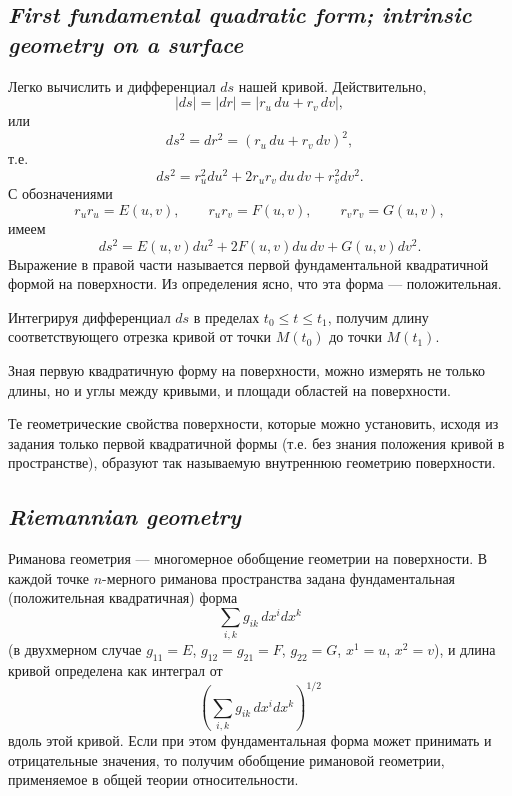 \subsection*{ \textit{First fundamental quadratic form; intrinsic geometry on a surface}}
\begin{rusblock}
Легко вычислить и дифференциал $ds$ нашей кривой. Действительно,
\[
|ds|=|dr|=|r_u\,du+r_v\,dv|,
\]
или
\[
ds^2=dr^2=(r_u\,du+r_v\,dv)^2,
\]
т.е.
\[
ds^2=r_u^2du^2+2r_ur_v\,du\,dv+r_v^2dv^2.
\]
С обозначениями
\[
r_ur_u=E(u,v),\qquad r_ur_v=F(u,v),\qquad r_vr_v=G(u,v),
\]
имеем
\[
ds^2=E(u,v)du^2+2F(u,v)du\,dv+G(u,v)dv^2.
\]
Выражение в правой части называется первой фундаментальной квадратичной формой на поверхности. Из определения ясно, что эта форма --- положительная.

Интегрируя дифференциал $ds$ в пределах $t_0\le t\le t_1$, получим длину соответствующего отрезка кривой от точки $M(t_0)$ до точки $M(t_1)$.

Зная первую квадратичную форму на поверхности, можно измерять не только длины, но и углы между кривыми, и площади областей на поверхности.

Те геометрические свойства поверхности, которые можно установить, исходя из задания только первой квадратичной формы (т.е. без знания положения кривой в пространстве), образуют так называемую внутреннюю геометрию поверхности.
\end{rusblock}

\subsection*{ \textit{Riemannian geometry}}
\begin{rusblock}
Риманова геометрия --- многомерное обобщение геометрии на поверхности. В каждой точке $n$-мерного риманова пространства задана фундаментальная (положительная квадратичная) форма
\[
\sum_{i,k}g_{ik}\,dx^i dx^k
\]
(в двухмерном случае $g_{11}=E$, $g_{12}=g_{21}=F$, $g_{22}=G$, $x^1=u$, $x^2=v$), и длина кривой определена как интеграл от
\[
\left(\sum_{i,k}g_{ik}\,dx^i dx^k\right)^{1/2}
\]
вдоль этой кривой. Если при этом фундаментальная форма может принимать и отрицательные значения, то получим обобщение римановой геометрии, применяемое в общей теории относительности.
\end{rusblock}

